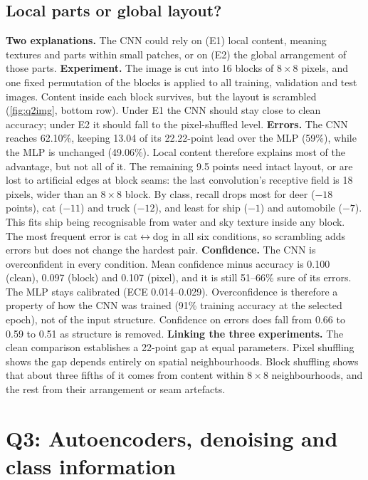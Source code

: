 \documentclass[10pt,twocolumn,letterpaper]{article}
\begin{document}
\subsection{Local parts or global layout?}
\textbf{Two explanations.} The CNN could rely on (E1) local content, meaning textures and parts within small patches, or on (E2) the global arrangement of those parts.
\textbf{Experiment.} The image is cut into 16 blocks of $8{\times}8$ pixels, and one fixed permutation of the blocks is applied to all training, validation and test images.
Content inside each block survives, but the layout is scrambled (\cref{fig:q2img}, bottom row).
Under E1 the CNN should stay close to clean accuracy; under E2 it should fall to the pixel-shuffled level.
\textbf{Errors.} The CNN reaches 62.10\%, keeping 13.04 of its 22.22-point lead over the MLP (59\%), while the MLP is unchanged (49.06\%).
Local content therefore explains most of the advantage, but not all of it.
The remaining 9.5 points need intact layout, or are lost to artificial edges at block seams: the last convolution's receptive field is 18 pixels, wider than an $8{\times}8$ block.
By class, recall drops most for deer ($-18$ points), cat ($-11$) and truck ($-12$), and least for ship ($-1$) and automobile ($-7$).
This fits ship being recognisable from water and sky texture inside any block.
The most frequent error is cat$\leftrightarrow$dog in all six conditions, so scrambling adds errors but does not change the hardest pair.
\textbf{Confidence.} The CNN is overconfident in every condition.
Mean confidence minus accuracy is 0.100 (clean), 0.097 (block) and 0.107 (pixel), and it is still 51--66\% sure of its errors.
The MLP stays calibrated (ECE 0.014--0.029).
Overconfidence is therefore a property of how the CNN was trained (91\% training accuracy at the selected epoch), not of the input structure.
Confidence on errors does fall from 0.66 to 0.59 to 0.51 as structure is removed.
\textbf{Linking the three experiments.} The clean comparison establishes a 22-point gap at equal parameters.
Pixel shuffling shows the gap depends entirely on spatial neighbourhoods.
Block shuffling shows that about three fifths of it comes from content within $8{\times}8$ neighbourhoods, and the rest from their arrangement or seam artefacts.

\section{Q3: Autoencoders, denoising and class information}
\end{document}
